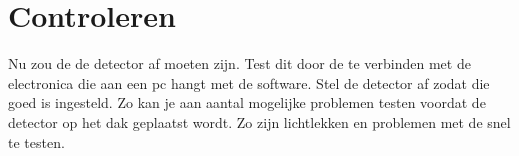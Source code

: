 \section{Controleren}

Nu zou de de detector af moeten zijn. Test dit door de \pmt te verbinden
met de \hisparc electronica die aan een pc hangt met de \hisparc
software. Stel de detector af zodat die goed is ingesteld. Zo kan je aan
aantal mogelijke problemen testen voordat de detector op het dak
geplaatst wordt. Zo zijn lichtlekken en problemen met de \pmt snel te
testen.



